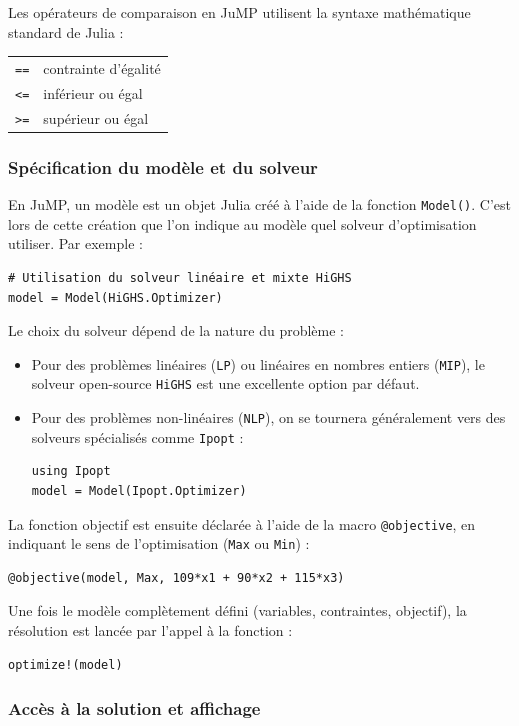 Les opérateurs de comparaison en JuMP utilisent la syntaxe mathématique standard de Julia :\\
\begin{tabular}{ll}
\verb|==| & contrainte d'égalité \\
\verb|<=| & inférieur ou égal \\
\verb|>=| & supérieur ou égal
\end{tabular}

\subsubsection{Spécification du modèle et du solveur}

En JuMP, un modèle est un objet Julia créé à l'aide de la fonction \verb|Model()|. C'est lors de cette création que l'on indique au modèle quel solveur d'optimisation utiliser. Par exemple :
\begin{verbatim}
# Utilisation du solveur linéaire et mixte HiGHS
model = Model(HiGHS.Optimizer)
\end{verbatim}
Le choix du solveur dépend de la nature du problème :
\begin{itemize}
\item
Pour des problèmes linéaires (\verb|LP|) ou linéaires en nombres entiers (\verb|MIP|), le solveur open-source \verb|HiGHS| est une excellente option par défaut.
\item
Pour des problèmes non-linéaires (\verb|NLP|), on se tournera généralement vers des solveurs spécialisés comme \verb|Ipopt| :
\begin{verbatim}
using Ipopt
model = Model(Ipopt.Optimizer)
\end{verbatim}
\end{itemize}
La fonction objectif est ensuite déclarée à l'aide de la macro \verb|@objective|, en indiquant le sens de l'optimisation (\verb|Max| ou \verb|Min|) :
\begin{verbatim}
@objective(model, Max, 109*x1 + 90*x2 + 115*x3)
\end{verbatim}
Une fois le modèle complètement défini (variables, contraintes, objectif), la résolution est lancée par l'appel à la fonction :
\begin{verbatim}
optimize!(model)
\end{verbatim}

\subsubsection{Accès à la solution et affichage}

